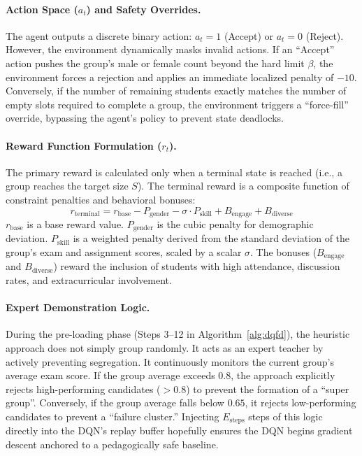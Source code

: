 \documentclass{icai2026} %
\begin{document}
\paragraph{Action Space ($a_t$) and Safety Overrides.}
The agent outputs a discrete binary action: $a_t = 1$ (Accept) or $a_t = 0$ (Reject). However, the environment dynamically masks invalid actions. If an ``Accept'' action pushes the group's male or female count beyond the hard limit $\beta$, the environment forces a rejection and applies an immediate localized penalty of $-10$. Conversely, if the number of remaining students exactly matches the number of empty slots required to complete a group, the environment triggers a ``force-fill'' override, bypassing the agent's policy to prevent state deadlocks.

\paragraph{Reward Function Formulation ($r_t$).}
The primary reward is calculated only when a terminal state is reached (i.e., a group reaches the target size $S$). The terminal reward is a composite function of constraint penalties and behavioral bonuses:
\begin{equation} \label{eq:reward_function}
    r_{\text{terminal}} = r_{\text{base}} - P_{\text{gender}} - \sigma \cdot P_{\text{skill}} + B_{\text{engage}} + B_{\text{diverse}}
\end{equation}
$r_{\text{base}}$ is a base reward value.
$P_{\text{gender}}$ is the cubic penalty for demographic deviation.
$P_{\text{skill}}$ is a weighted penalty derived from the standard deviation of the group's exam and assignment scores, scaled by a scalar $\sigma$.
The bonuses ($B_{\text{engage}}$ and $B_{\text{diverse}}$) reward the inclusion of students with high attendance, discussion rates, and extracurricular involvement.

\paragraph{Expert Demonstration Logic.}
During the pre-loading phase (Steps 3--12 in Algorithm~\ref{alg:dqfd}), the heuristic approach does not simply group randomly. It acts as an expert teacher by actively preventing segregation. It continuously monitors the current group's average exam score. If the group average exceeds $0.8$, the approach explicitly rejects high-performing candidates ($>0.8$) to prevent the formation of a ``super group''. Conversely, if the group average falls below $0.65$, it rejects low-performing candidates to prevent a ``failure cluster.'' Injecting $E_{\text{steps}}$ steps of this logic directly into the DQN's replay buffer hopefully ensures the DQN begins gradient descent anchored to a pedagogically safe baseline.
\end{document}
